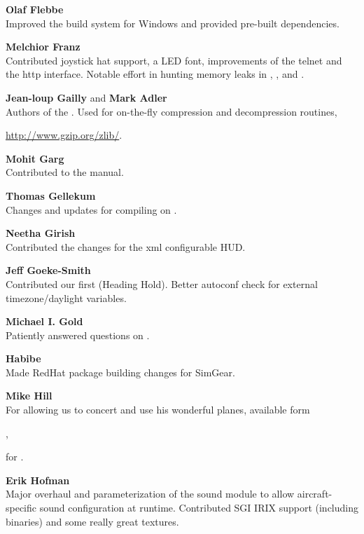 \noindent \textbf{Olaf Flebbe}\\
  Improved the build system for Windows and provided pre-built dependencies.
 \medskip

\noindent \textbf{Melchior Franz}\\
  Contributed joystick hat support, a LED font, improvements of the telnet and the http interface. Notable effort in hunting memory leaks in \FlightGear{}, \SimGear{}, and \JSBSim{}.
  \medskip

\noindent \textbf{Jean-loup Gailly} and \textbf{Mark Adler}\\
  Authors of the .  Used for on-the-fly compression and
  decompression routines,

  \href{http://www.gzip.org/zlib/}{http://www.gzip.org/zlib/}.
 \medskip

\noindent \textbf{Mohit Garg}\\
 Contributed to the manual.
 \medskip

\noindent \textbf{Thomas Gellekum}\\
  Changes and updates for compiling on .
 \medskip

\noindent \textbf{Neetha Girish}\\
  Contributed the changes for the xml configurable HUD.
 \medskip

\noindent \textbf{Jeff Goeke-Smith}\\
  Contributed our first  (Heading Hold).
  Better autoconf check for external timezone/daylight variables.
 \medskip

\noindent \textbf{Michael I. Gold}\\
 Patiently answered questions on .
 \medskip

\noindent \textbf{Habibe}\\
 Made RedHat package building changes for SimGear.
 \medskip

\noindent \textbf{Mike Hill}\\
 For allowing us to concert and use his wonderful planes, available form
 \medskip

 ,

 \noindent
 for \FlightGear{}.
 \medskip

\noindent \textbf{Erik Hofman}\\
  Major overhaul and parameterization of the sound module to allow
  aircraft-specific sound configuration at runtime.
  Contributed SGI IRIX support (including binaries) and some really great
  textures.
 \medskip

